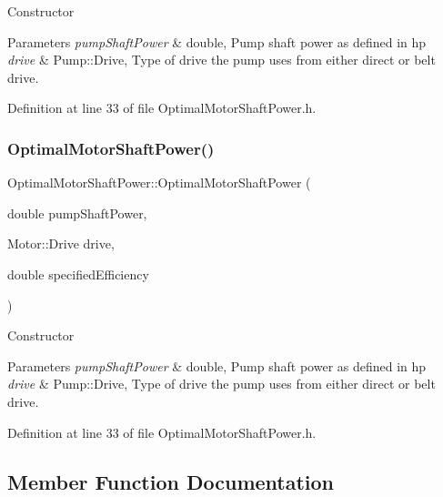Constructor 
\begin{DoxyParams}{Parameters}
{\em pump\+Shaft\+Power} & double, Pump shaft power as defined in hp \\
\hline
{\em drive} & Pump\+::\+Drive, Type of drive the pump uses from either direct or belt drive. \\
\hline
\end{DoxyParams}


Definition at line 33 of file Optimal\+Motor\+Shaft\+Power.\+h.

\mbox{\label{class_optimal_motor_shaft_power_ad830e1f8a7931e3c6bec5f8828d57e83}} 
\subsubsection{\texorpdfstring{Optimal\+Motor\+Shaft\+Power()}{OptimalMotorShaftPower()}\hspace{0.1cm}{\footnotesize\ttfamily [3/3]}}
{\footnotesize\ttfamily Optimal\+Motor\+Shaft\+Power\+::\+Optimal\+Motor\+Shaft\+Power (\begin{DoxyParamCaption}\item[{double}]{pump\+Shaft\+Power,  }\item[{Motor\+::\+Drive}]{drive,  }\item[{double}]{specified\+Efficiency }\end{DoxyParamCaption})\hspace{0.3cm}{\ttfamily [inline]}}

Constructor 
\begin{DoxyParams}{Parameters}
{\em pump\+Shaft\+Power} & double, Pump shaft power as defined in hp \\
\hline
{\em drive} & Pump\+::\+Drive, Type of drive the pump uses from either direct or belt drive. \\
\hline
\end{DoxyParams}


Definition at line 33 of file Optimal\+Motor\+Shaft\+Power.\+h.



\subsection{Member Function Documentation}
\mbox{\label{class_optimal_motor_shaft_power_a486edea429b828e5d989fb32034f4059}} 
